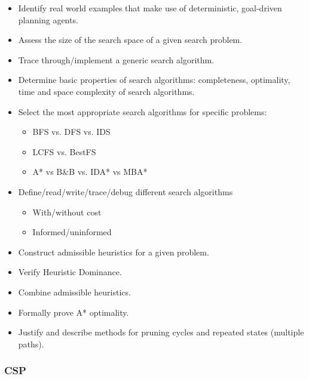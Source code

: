 \documentclass{article}
\begin{document}
\begin{itemize}
    \item Identify real world examples that make use of deterministic, goal-driven planning agents.
    \item Assess the size of the search space of a given search problem.
    \item Trace through/implement a generic search algorithm.
    \item Determine basic properties of search algorithms: completeness, optimality, time and space complexity of search algorithms.
    \item Select the most appropriate search algorithms for specific problems:
        \begin{itemize}
            \item BFS vs. DFS vs. IDS
            \item LCFS vs. BestFS
            \item A* vs B\&B vs. IDA* vs MBA*
        \end{itemize}
    \item Define/read/write/trace/debug different search algorithms
        \begin{itemize}
            \item With/without cost
            \item Informed/uninformed
        \end{itemize}
    \item Construct admissible heuristics for a given problem.
    \item Verify Heuristic Dominance.
    \item Combine admissible heuristics.
    \item Formally prove A* optimality.
    \item Justify and describe methods for pruning cycles and repeated states (multiple paths).
\end{itemize}

\subsubsection*{CSP}
\end{document}
